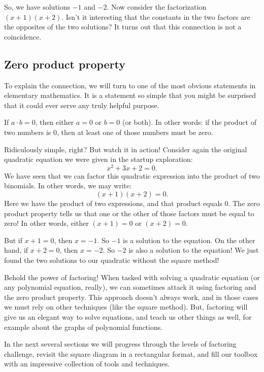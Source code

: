 So, we have solutions $-1$ and $-2$. Now consider the factorization $(x+1)(x+2)$. Isn't it interesting that the constants in the two factors are the opposites of the two solutions? It turns out that this connection is not a coincidence.

\subsection{Zero product property}

To explain the connection, we will turn to one of the most obvious statements in elementary mathematics. It is a statement so simple that you might be surprised that it could ever serve any truly helpful purpose.

\begin{boxeddef}
If $a \cdot b = 0$, then either $a=0$ or $b=0$ (or both). In other words: if the product of two numbers is 0, then at least one of those numbers must be zero.
\end{boxeddef}

Ridiculously simple, right? But watch it in action! Consider again the original quadratic equation we were given in the startup exploration:
\[x^2 + 3x + 2 = 0.\]
We have seen that we can factor this quadratic expression into the product of two binomials. In other words, we may write:
\[(x+1)(x+2) = 0.\]
Here we have the product of two expressions, and that product equals 0. The zero product property tells us that one or the other of those factors must be equal to zero! In other words, either $(x+1) = 0$ or $(x+2)=0$.

But if $x+1=0$, then $x=-1$. So $-1$ is a solution to the equation. On the other hand, if $x+2=0$, then $x=-2$. So $-2$ is also a solution to the equation! We just found the two solutions to our quadratic without the square method!

Behold the power of factoring! When tasked with solving a quadratic equation (or any polynomial equation, really), we can sometimes attack it using factoring and the zero product property. This approach doesn't always work, and in those cases we must rely on other techniques (like the square method). But, factoring will give us an elegant way to solve equations, and teach us other things as well, for example about the graphs of polynomial functions.

In the next several sections we will progress through the levels of factoring challenge, revisit the square diagram in a rectangular format, and fill our toolbox with an impressive collection of tools and techniques.

